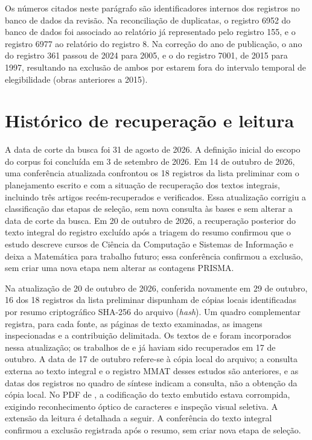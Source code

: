 \begin{apendicesenv}
Os números citados neste parágrafo são identificadores internos dos registros no banco de dados da revisão. Na reconciliação de duplicatas, o registro 6952 do banco de dados foi associado ao relatório já representado pelo registro 155, e o registro 6977 ao relatório do registro 8. Na correção do ano de publicação, o ano do registro 361 passou de 2024 para 2005, e o do registro 7001, de 2015 para 1997, resultando na exclusão de ambos por estarem fora do intervalo temporal de elegibilidade (obras anteriores a 2015).

\section{Histórico de recuperação e leitura}

A data de corte da busca foi 31 de agosto de 2026. A definição inicial do escopo do corpus foi concluída em 3 de setembro de 2026. Em 14 de outubro de 2026, uma conferência atualizada confrontou os 18 registros da lista preliminar com o planejamento escrito e com a situação de recuperação dos textos integrais, incluindo três artigos recém-recuperados e verificados. Essa atualização corrigiu a classificação das etapas de seleção, sem nova consulta às bases e sem alterar a data de corte da busca. Em 20 de outubro de 2026, a recuperação posterior do texto integral do registro excluído após a triagem do resumo confirmou que o estudo descreve cursos de Ciência da Computação e Sistemas de Informação e deixa a Matemática para trabalho futuro; essa conferência confirmou a exclusão, sem criar uma nova etapa nem alterar as contagens PRISMA.

Na atualização de 20 de outubro de 2026, conferida novamente em 29 de outubro, 16 dos 18 registros da lista preliminar dispunham de cópias locais identificadas por resumo criptográfico SHA-256 do arquivo (\textit{hash}). Um quadro complementar registra, para cada fonte, as páginas de texto examinadas, as imagens inspecionadas e a contribuição delimitada. Os textos de  e  foram incorporados nessa atualização; os trabalhos de  e  já haviam sido recuperados em 17 de outubro. A data de 17 de outubro refere-se à cópia local do arquivo; a consulta externa ao texto integral e o registro MMAT desses estudos são anteriores, e as datas dos registros no quadro de síntese indicam a consulta, não a obtenção da cópia local. No PDF de , a codificação do texto embutido estava corrompida, exigindo reconhecimento óptico de caracteres e inspeção visual seletiva. A extensão da leitura é detalhada a seguir. A conferência do texto integral confirmou a exclusão registrada após o resumo, sem criar nova etapa de seleção.


\end{apendicesenv}
